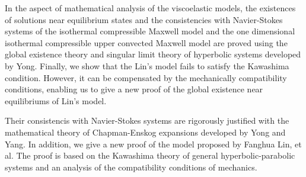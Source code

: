 \begin{eabstract}
  In the aspect of mathematical analysis of the viscoelastic models, the existences of solutions near equilibrium states and the consistencies with Navier-Stokes systems of the isothermal compressible Maxwell model and the one dimensional isothermal compressible upper convected Maxwell model are proved using the global existence theory and singular limit theory of hyperbolic systems developed by Yong. Finally, we show that the Lin's model fails to satisfy the Kawashima condition. However, it can be compensated by the mechanically compatibility conditions, enabling us to give a new proof of the global existence near equilibriums of Lin's model.

  Their consistencis with Navier-Stokes systems are rigorously justified with the mathematical theory of Chapman-Enskog expansions developed by Yong and Yang. In addition, we give a new proof of the model proposed by Fanghua Lin, et al. The proof is based on the Kawashima theory of general hyperbolic-parabolic systems and an analysis of the compatibility conditions of mechanics.
  

\end{eabstract}

